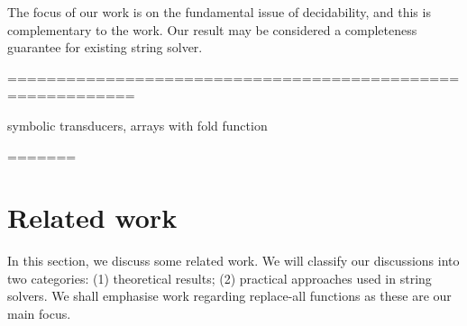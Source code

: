 The focus of our work is on the fundamental issue of decidability, and this is complementary to the work. Our result may be considered a completeness guarantee for existing string solver. 

===========================================================
 
symbolic transducers,   arrays with fold function


%
% 
=======

\section{Related work}

 
In this section, we discuss some related work. We will classify our discussions into two categories: (1) theoretical results; (2) practical approaches used in string solvers.  We shall emphasise work regarding replace-all functions as these are our main focus. 

